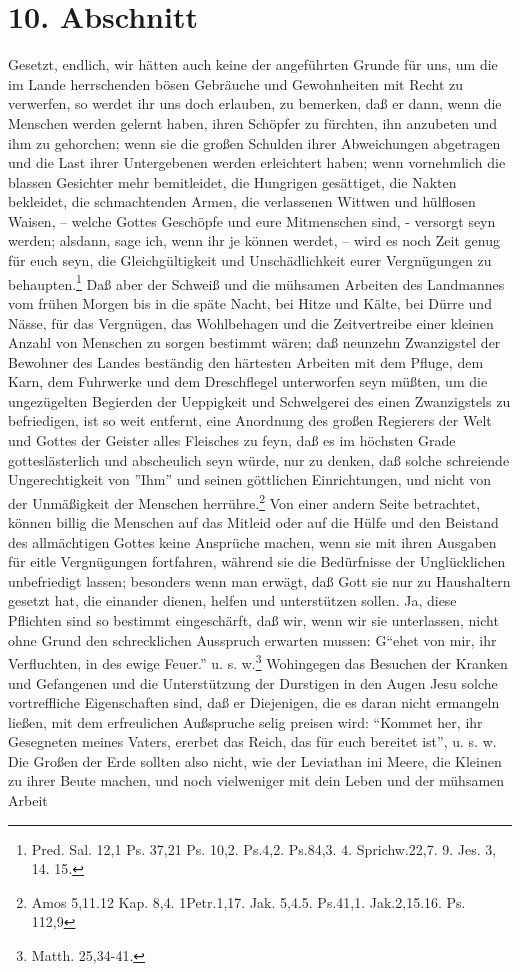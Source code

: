 \section{10. Abschnitt}

Gesetzt, endlich, wir hätten auch keine der angeführten Grunde für uns, um die im Lande herrschenden bösen Gebräuche und Gewohnheiten mit Recht zu verwerfen, so werdet ihr uns doch erlauben, zu bemerken, daß er dann, wenn die Menschen werden gelernt haben, ihren Schöpfer zu fürchten, ihn anzubeten und ihm zu gehorchen; wenn sie die großen Schulden ihrer Abweichungen abgetragen und die Last ihrer Untergebenen werden erleichtert haben; wenn vornehmlich die blassen Gesichter mehr bemitleidet, die Hungrigen gesättiget, die Nakten bekleidet, die schmachtenden Armen, die verlassenen Wittwen und hülflosen Waisen, -- welche Gottes Geschöpfe und eure Mitmenschen sind, - versorgt seyn werden; alsdann, sage ich, wenn ihr je können werdet, – wird es noch Zeit genug für euch seyn, die Gleichgültigkeit und Unschädlichkeit eurer Vergnügungen zu behaupten.\footnote{Pred. Sal. 12,1 Ps. 37,21 Ps. 10,2. Ps.4,2. Ps.84,3. 4. Sprichw.22,7. 9. Jes. 3, 14. 15.} Daß aber der Schweiß und die mühsamen Arbeiten des Landmannes vom frühen Morgen bis in die späte Nacht, bei Hitze und Kälte, bei Dürre und Nässe, für das Vergnügen, das Wohlbehagen und die Zeitvertreibe einer kleinen Anzahl von Menschen zu sorgen bestimmt wären; daß neunzehn Zwanzigstel der Bewohner des Landes beständig den härtesten Arbeiten mit dem Pfluge, dem Karn, dem Fuhrwerke und dem Dreschflegel unterworfen seyn müßten, um die ungezügelten Begierden der Ueppigkeit und Schwelgerei des einen Zwanzigstels zu befriedigen, ist so weit entfernt, eine Anordnung des großen Regierers der Welt und Gottes der Geister alles Fleisches zu feyn, daß es im höchsten Grade gotteslästerlich und abscheulich seyn würde, nur zu denken, daß solche schreiende Ungerechtigkeit von ''Ihm'' und seinen göttlichen Einrichtungen, und nicht von der Unmäßigkeit der Menschen herrühre.\footnote{Amos 5,11.12 Kap. 8,4. 1Petr.1,17. Jak. 5,4.5. Ps.41,1. Jak.2,15.16. Ps. 112,9} Von einer andern Seite betrachtet, können billig die Menschen auf das Mitleid oder auf die Hülfe und den Beistand des allmächtigen Gottes keine Ansprüche machen, wenn sie mit ihren Ausgaben für eitle Vergnügungen fortfahren, während sie die Bedürfnisse der Unglücklichen unbefriedigt lassen; besonders wenn man erwägt, daß Gott sie nur zu Haushaltern gesetzt hat, die einander dienen, helfen und unterstützen sollen. Ja, diese Pflichten sind so bestimmt eingeschärft, daß wir, wenn wir sie unterlassen, nicht ohne Grund den schrecklichen Ausspruch erwarten mussen: G"`ehet von mir, ihr Verfluchten, in des ewige Feuer."' u. s. w.\footnote{Matth. 25,34-41.} Wohingegen das Besuchen der Kranken und Gefangenen und die Unterstützung der Durstigen in den Augen Jesu solche vortreffliche Eigenschaften sind, daß er Diejenigen, die es daran nicht ermangeln ließen, mit dem erfreulichen Außspruche selig preisen wird: "`Kommet her, ihr Gesegneten meines Vaters, ererbet das Reich, das für euch bereitet ist"', u. s. w. Die Großen der Erde sollten also nicht, wie der Leviathan ini Meere, die Kleinen zu ihrer Beute machen, und noch vielweniger mit dein Leben und der mühsamen Arbeit 